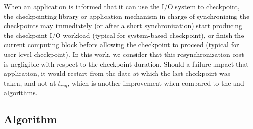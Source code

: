 When an application is informed that it can use the I/O system to
checkpoint, the checkpointing library or application mechanism
in charge of synchronizing the checkpoints may immediately (or after
a short synchronization) start producing the checkpoint I/O workload
(typical for system-based checkpoint),
or finish the current computing block before allowing the checkpoint
to proceed (typical for user-level checkpoint). In this work, we consider
that this resynchronization cost is negligible with respect to the
checkpoint duration. Should a failure impact that application,
it would restart from the date at which the last checkpoint was taken, and
not at $t_{req}$, which is another improvement when compared to the
\fifoblock and \nocoop algorithms.




\subsection{\leastwaste Algorithm}
\label{sec:least-waste}

